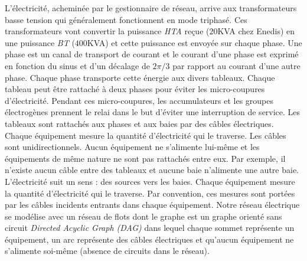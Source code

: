 L'\'electricit\'e, achemin\'ee par le gestionnaire de r\'eseau, arrive aux transformateurs basse tension qui g\'en\'eralement fonctionnent en mode triphas\'e.
Ces transformateurs vont convertir la puissance {\em HTA} re\c cue ($20$KVA chez Enedis) en une puissance {\em BT} ($400$KVA) et cette puissance est envoy\'ee sur chaque phase.
Une phase est un canal de transport de courant et 
le courant d'une phase est exprim\'e en fonction du sinus et d'un d\'ecalage de $2\pi/3$ par rapport au courant d'une autre phase.
Chaque phase transporte cette \'energie aux divers tableaux. 
Chaque tableau peut \^etre rattach\'e \`a deux phases pour \'eviter les micro-coupures d'\'electricit\'e. Pendant ces micro-coupures, les accumulateurs et les groupes \'electrog\`enes prennent le relai dans le but d'\'eviter une interruption de service.
Les tableaux sont rattach\'es aux phases et aux baies par des c\^ables \'electriques. 
Chaque \'equipement mesure la quantit\'e d'\'electricit\'e qui le traverse.
Les c\^ables sont unidirectionnels. 
Aucun \'equipement ne s'alimente lui-m\^eme et les \'equipements de m\^eme nature ne sont pas rattach\'es entre eux. Par exemple, il n'existe aucun c\^able entre des tableaux et aucune baie n'alimente une autre baie.
L'\'electricit\'e suit un sens : des sources vers les baies. 
Chaque \'equipement mesure la quantit\'e d'\'electricit\'e qui le traverse. 
 Par convention, ces mesures sont port\'ees par les c\^ables incidents entrants dans chaque \'equipement.
\newline
Notre r\'eseau \'electrique se  mod\'elise avec un r\'eseau de flots dont le graphe est un graphe orient\'e sans circuit {\em Directed Acyclic Graph (DAG)} dans lequel
chaque sommet repr\'esente un \'equipement,
un arc repr\'esente des c\^ables \'electriques et 
 qu'aucun \'equipement ne s'alimente soi-m\^eme (absence de circuits dans le r\'eseau). 